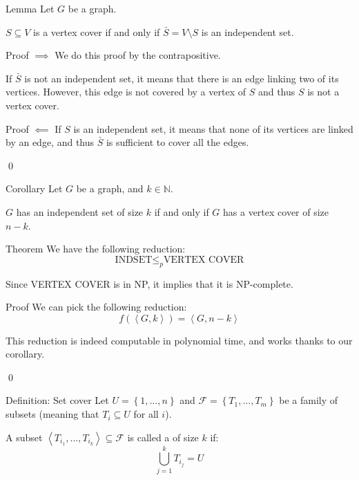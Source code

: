 \documentclass[a4paper]{article}
\begin{document}
\begin{parag}{Lemma}
    Let $G$ be a graph.

    $S \subseteq V$ is a vertex cover if and only if $\bar{S} = V \setminus S$ is an independent set.


    \begin{subparag}{Proof $\implies$}
        We do this proof by the contrapositive.

        If $\bar{S}$ is not an independent set, it means that there is an edge linking two of its vertices. However, this edge is not covered by a vertex of $S$ and thus $S$ is not a vertex cover.
    \end{subparag}
    
    \begin{subparag}{Proof $\impliedby$}
        If $S$ is an independent set, it means that none of its vertices are linked by an edge, and thus $\bar{S}$ is sufficient to cover all the edges.

        \qed
    \end{subparag}
\end{parag}

\begin{parag}{Corollary}
    Let $G$ be a graph, and $k \in \mathbb{N}$.

    $G$ has an independent set of size $k$ if and only if $G$ has a vertex cover of size $n-k$.
\end{parag}


\begin{parag}{Theorem}
    We have the following reduction: 
    \[\text{INDSET} \leq_p \text{VERTEX COVER}\]
    
    Since VERTEX COVER is in NP, it implies that it is NP-complete.

    \begin{subparag}{Proof}
        We can pick the following reduction: 
        \[f\left(\left\langle G, k \right\rangle\right) = \left\langle G, n-k \right\rangle\]
        
        This reduction is indeed computable in polynomial time, and works thanks to our corollary.

        \qed
    \end{subparag}
\end{parag}

\begin{parag}{Definition: Set cover}
    Let $U = \left\{1, \ldots, n\right\}$ and $\mathcal{F} = \left\{T_1, \ldots, T_m\right\}$ be a family of subsets (meaning that $T_i \subseteq U$ for all $i$). 

    A subset $\left\langle T_{i_1}, \ldots, T_{i_k} \right\rangle \subseteq \mathcal{F}$ is called a  of size $k$ if: 
    \[\bigcup_{j=1}^{k} T_{i_j} = U\]
\end{parag}
\end{document}
